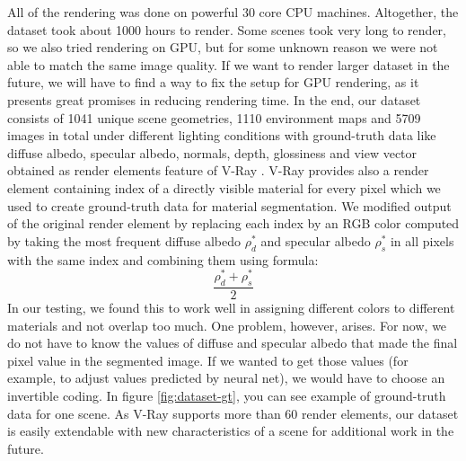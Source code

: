 \newline
All of the rendering was done on powerful 30 core CPU machines. Altogether, the dataset took about 1000 hours to render. Some scenes took very long to render, so we also tried rendering on GPU, but for some unknown reason we were not able to match the same image quality. If we want to render larger dataset in the future, we will have to find a way to fix the setup for GPU rendering, as it presents great promises in reducing rendering time.
\newline
In the end, our dataset consists of 1041 unique scene geometries, 1110 environment maps and 5709 images in total under different lighting conditions with ground-truth data like diffuse albedo, specular albedo, normals, depth, glossiness and view vector obtained as render elements feature of V-Ray \cite{V-Ray-Render-elements}. V-Ray provides also a render element containing index of a directly visible material for every pixel which we used to create ground-truth data for material segmentation. We modified output of the original render element by replacing each index by an RGB color computed by taking the most frequent diffuse albedo $\rho^*_d$ and specular albedo $\rho^*_s$ in all pixels with the same index and combining them using formula:
$$\frac{\rho^*_d + \rho^*_s}{2}$$
In our testing, we found this to work well in assigning different colors to different materials and not overlap too much. One problem, however, arises. For now, we do not have to know the values of diffuse and specular albedo that made the final pixel value in the segmented image. If we wanted to get those values (for example, to adjust values predicted by neural net), we would have to choose an invertible coding. In figure \ref{fig:dataset-gt}, you can see example of ground-truth data for one scene.
\newline
As V-Ray supports more than 60 render elements, our dataset is easily extendable with new characteristics of a scene for additional work in the future.
